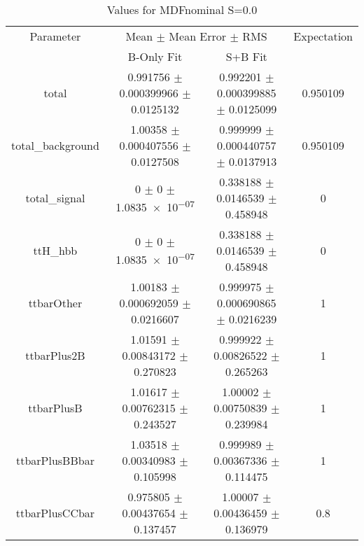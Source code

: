 \begin{table}
\centering
\caption{Values for MDFnominal S=0.0}
\begin{tabular}{cccc}
\toprule
Parameter & \multicolumn{2}{c}{Mean $\pm$ Mean Error $\pm$ RMS} & Expectation\\
 & B-Only Fit & S+B Fit & \\
\midrule
total & \num{0.991756} $\pm$ \num{0.000399966} $\pm$ \num{0.0125132} & \num{0.992201} $\pm$ \num{0.000399885} $\pm$ \num{0.0125099} & \num{0.950109}\\
total\_background & \num{1.00358} $\pm$ \num{0.000407556} $\pm$ \num{0.0127508} & \num{0.999999} $\pm$ \num{0.000440757} $\pm$ \num{0.0137913} & \num{0.950109}\\
total\_signal & \num{0} $\pm$ \num{0} $\pm$ \num{1.0835e-07} & \num{0.338188} $\pm$ \num{0.0146539} $\pm$ \num{0.458948} & \num{0}\\
ttH\_hbb & \num{0} $\pm$ \num{0} $\pm$ \num{1.0835e-07} & \num{0.338188} $\pm$ \num{0.0146539} $\pm$ \num{0.458948} & \num{0}\\
ttbarOther & \num{1.00183} $\pm$ \num{0.000692059} $\pm$ \num{0.0216607} & \num{0.999975} $\pm$ \num{0.000690865} $\pm$ \num{0.0216239} & \num{1}\\
ttbarPlus2B & \num{1.01591} $\pm$ \num{0.00843172} $\pm$ \num{0.270823} & \num{0.999922} $\pm$ \num{0.00826522} $\pm$ \num{0.265263} & \num{1}\\
ttbarPlusB & \num{1.01617} $\pm$ \num{0.00762315} $\pm$ \num{0.243527} & \num{1.00002} $\pm$ \num{0.00750839} $\pm$ \num{0.239984} & \num{1}\\
ttbarPlusBBbar & \num{1.03518} $\pm$ \num{0.00340983} $\pm$ \num{0.105998} & \num{0.999989} $\pm$ \num{0.00367336} $\pm$ \num{0.114475} & \num{1}\\
ttbarPlusCCbar & \num{0.975805} $\pm$ \num{0.00437654} $\pm$ \num{0.137457} & \num{1.00007} $\pm$ \num{0.00436459} $\pm$ \num{0.136979} & \num{0.8}\\
\bottomrule
\end{tabular}
\end{table}